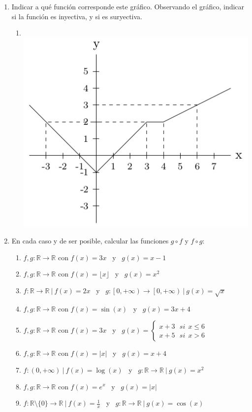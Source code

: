 \documentclass[a4paper]{article}
\newcommand{\exercise}{\item}
\begin{document}
\begin{enumerate}
	\exercise Indicar a qué función corresponde este gráfico. Observando el gráfico, indicar si la función es inyectiva, y si es suryectiva.
	\begin{enumerate} [label=(\alph*)]
		\item ~\\ [-15pt] \includegraphics[scale=0.5]{func1.png}
	\end{enumerate}

	\exercise En cada caso y de ser posible, calcular las funciones $g \circ f$ y $f \circ g$:
	\begin{enumerate} [label=(\alph*)]
		\item $f,g:\mathbb{R} \to \mathbb{R}$ con $f(x)=3x$ ~y~ $g(x)=x-1$
		\item $f,g:\mathbb{R} \to \mathbb{R}$ con $f(x)=\lfloor x \rfloor$ ~y~ $g(x)=x^2$
		\item $f:\mathbb{R} \to \mathbb{R} ~|~ f(x)=2x$ ~y~ $g:\left[0,+\infty\right) \to \left[0,+\infty\right) ~|~ g(x)=\sqrt{x}$
		\item $f,g:\mathbb{R} \to \mathbb{R}$ con $f(x)=\sin(x)$ ~y~ $g(x)=3x+4$
		\item $f,g:\mathbb{R} \to \mathbb{R}$ con $f(x)=3x$ ~y~ $g(x)=\left\{\begin{matrix}x+3 ~~~ si ~~x\leq 6\\ x+5 ~~~ si ~~x>6\end{matrix}\right.$
		\item $f,g:\mathbb{R} \to \mathbb{R}$ con $f(x)=|x|$ ~y~ $g(x)=x+4$
		\item $f:\left(0,+\infty\right) ~|~ f(x)=\log(x)$ ~y~ $g:\mathbb{R} \to \mathbb{R} ~|~ g(x)=x^2$
		\item $f,g:\mathbb{R} \to \mathbb{R}$ con $f(x)=e^{x}$ ~y~ $g(x)=|x|$
		\item $f:\mathbb{R}\setminus\{0\} \to \mathbb{R} ~|~ f(x)=\displaystyle{\frac{1}{x}}$ ~y~ $g:\mathbb{R} \to \mathbb{R} ~|~ g(x)=\cos(x)$


\end{enumerate}
\end{enumerate}
\end{document}
